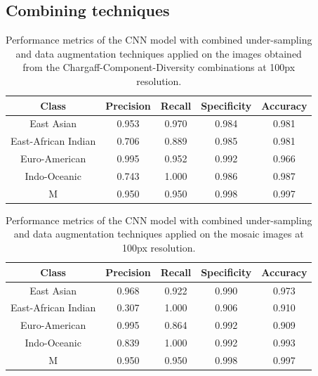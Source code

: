 \subsection{Combining techniques}
\label{subsec:combining_techniques}

\label{subsubsec:results_combining_techniques}

\begin{table}[H]
	\centering
	\begin{tabular}{|c|c|c|c|c|}
		\hline
		\textbf{Class}      & \textbf{Precision} & \textbf{Recall} & \textbf{Specificity} & \textbf{Accuracy} \\
		\hline
		East Asian          & 0.953              & 0.970           & 0.984                & 0.981             \\
		East-African Indian & 0.706              & 0.889           & 0.985                & 0.981             \\
		Euro-American       & 0.995              & 0.952           & 0.992                & 0.966             \\
		Indo-Oceanic        & 0.743              & 1.000           & 0.986                & 0.987             \\
		M                   & 0.950              & 0.950           & 0.998                & 0.997             \\
		\hline
	\end{tabular}
	\caption{Performance metrics of the CNN model with combined under-sampling and data augmentation techniques applied on the images obtained from the
		Chargaff-Component-Diversity combinations at 100px resolution.}
	\label{tab:combined_techniques_performance_metrics}
\end{table}

\begin{table}[H]
	\centering
	\begin{tabular}{|c|c|c|c|c|}
		\hline
		\textbf{Class}      & \textbf{Precision} & \textbf{Recall} & \textbf{Specificity} & \textbf{Accuracy} \\
		\hline
		East Asian          & 0.968              & 0.922           & 0.990                & 0.973             \\
		East-African Indian & 0.307              & 1.000           & 0.906                & 0.910             \\
		Euro-American       & 0.995              & 0.864           & 0.992                & 0.909             \\
		Indo-Oceanic        & 0.839              & 1.000           & 0.992                & 0.993             \\
		M                   & 0.950              & 0.950           & 0.998                & 0.997             \\
		\hline
	\end{tabular}
	\caption{Performance metrics of the CNN model with combined under-sampling and data augmentation techniques applied on the mosaic images at 100px
		resolution.}
	\label{tab:combined_techniques_performance_metrics_mosaic}
\end{table}